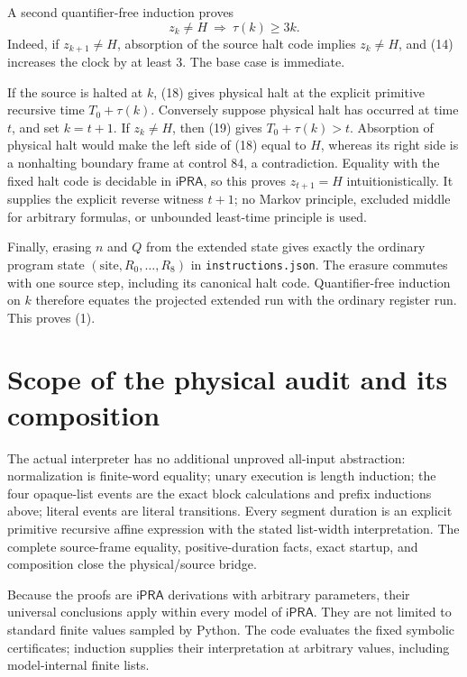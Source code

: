 \documentclass[11pt]{article}
\newcommand{\ipra}{\mathsf{iPRA}}
\begin{document}
A second quantifier-free induction proves
\[
 z_k\neq H\ \Longrightarrow\ \tau(k)\geq3k.                    \tag{19}
\]
Indeed, if $z_{k+1}\neq H$, absorption of the source halt code implies
$z_k\neq H$, and (14) increases the clock by at least 3.  The base case
is immediate.

If the source is halted at $k$, (18) gives physical halt at the explicit
primitive recursive time $T_0+\tau(k)$.  Conversely suppose physical
halt has occurred at time $t$, and set $k=t+1$.  If $z_k\neq H$, then
(19) gives $T_0+\tau(k)>t$.  Absorption of physical halt would make the
left side of (18) equal to $H$, whereas its right side is a nonhalting
boundary frame at control 84, a contradiction.  Equality with the fixed
halt code is decidable in $\ipra$, so this proves $z_{t+1}=H$
intuitionistically.  It supplies the explicit reverse witness $t+1$;
no Markov principle, excluded middle for arbitrary formulas, or
unbounded least-time principle is used.

Finally, erasing $n$ and $Q$ from the extended state gives exactly the
ordinary program state $(\text{site},R_0,\ldots,R_8)$ in
\texttt{instructions.json}.  The erasure commutes with one source step,
including its canonical halt code.  Quantifier-free induction on $k$
therefore equates the projected extended run with the ordinary register
run.  This proves (1).

\section{Scope of the physical audit and its composition}

The actual interpreter has no additional unproved all-input abstraction:
normalization is finite-word equality; unary execution is length
induction; the four opaque-list events are the exact block calculations
and prefix inductions above; literal events are literal transitions.
Every segment duration is an explicit primitive recursive affine
expression with the stated list-width interpretation.  The complete
source-frame equality, positive-duration facts, exact startup, and
composition close the physical/source bridge.

Because the proofs are $\ipra$ derivations with arbitrary parameters,
their universal conclusions apply within every model of $\ipra$.
They are not limited to standard finite values sampled by Python.
The code evaluates the fixed symbolic certificates; induction supplies
their interpretation at arbitrary values, including model-internal
finite lists.
\end{document}
